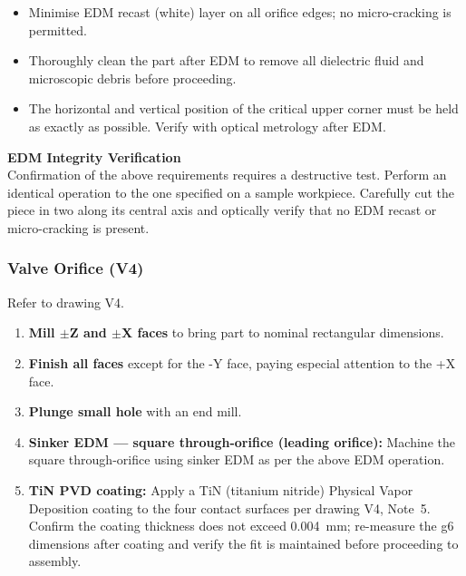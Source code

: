 \documentclass[12pt, letterpaper]{report}%
\newcounter{mycounter}           %
\newcounter{sub}[mycounter]      %
\begin{document}
\begin{enumerate}[itemsep=4pt]
\begin{itemize}[itemsep=2pt]
								small a fillet radius as possible.
								This is the mission-critical corner; a larger fillet directly degrades
								the effective diameter accuracy.
					\item Minimise EDM recast (white) layer on all orifice edges; no
								micro-cracking is permitted.
					\item Thoroughly clean the part after EDM to remove all dielectric fluid
								and microscopic debris before proceeding.
					\item The horizontal and vertical position of the critical
								upper corner must be held as exactly as possible.
								Verify with optical metrology after EDM.
				\end{itemize}
\end{enumerate}

\begin{notebox}
\textbf{EDM Integrity Verification} \\
Confirmation of the above requirements requires a destructive test.
Perform an identical operation to the one specified on a sample workpiece. Carefully cut
the piece in two along its central axis and optically verify that no EDM recast or
micro-cracking is present.
\end{notebox}

\subsubsection{Valve Orifice (V4)}
\label{sec:mfg:V4}

Refer to drawing V4.

\begin{enumerate}[itemsep=4pt]
	\item \textbf{Mill $\pm$Z and $\pm$X faces} to bring part to nominal rectangular
				dimensions.
	\item \textbf{Finish all faces} except for the -Y face, paying especial attention
				to the +X face.
	\item \textbf{Plunge small hole} with an end mill.
	\item \textbf{Sinker EDM --- square through-orifice (leading orifice):}
				Machine the square through-orifice using sinker EDM as per the above EDM operation.
	\item \textbf{TiN PVD coating:} Apply a TiN (titanium nitride) Physical Vapor
				Deposition coating to the four contact surfaces per drawing V4, Note~5.
				Confirm the coating thickness does not exceed \SI{0.004}{\milli\meter};
				re-measure the g6 dimensions after coating and verify the fit is maintained
				before proceeding to assembly.
\end{enumerate}
\end{document}
